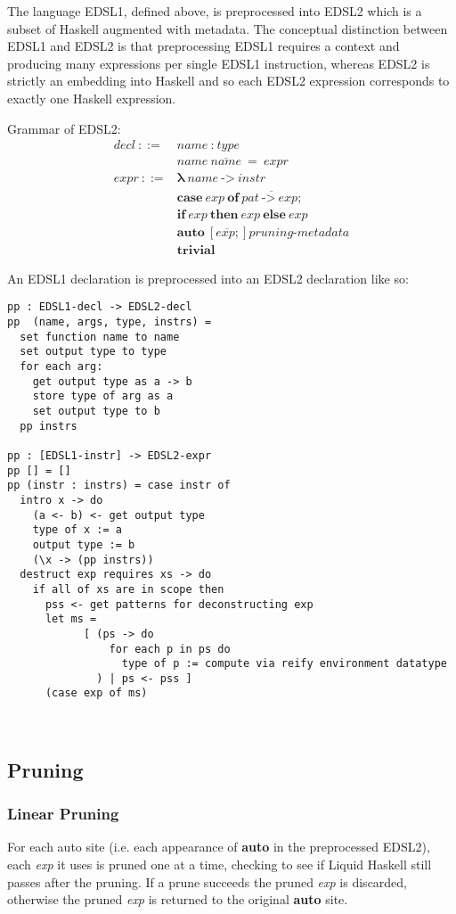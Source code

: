 The language EDSL1, defined above, is preprocessed into EDSL2 which is a subset of Haskell augmented with metadata. 
The conceptual distinction between EDSL1 and EDSL2 is that preprocessing EDSL1 requires a context and producing many expressions per single EDSL1 instruction, whereas EDSL2 is strictly an embedding into Haskell and so each EDSL2 expression corresponds to exactly one Haskell expression.

Grammar of EDSL2:
\begin{align*}
  \textit{decl}~ ::= &
    \textit{name} ~ : ~ \textit{type} \\ &
    \textit{name} ~ \overline{\textit{name}} ~ = ~ \textit{expr}
  \\
  \textit{expr}~ ::= &
    \mathbf{\lambda} ~ \textit{name} ~ \textbf{->} ~ \textit{instr} \\ &
    \textbf{case} ~ \textit{exp} ~ \textbf{of} ~ \overline{\textit{pat} ~ \textbf{->} ~ \textit{exp} ;} \\ & 
    \textbf{if} ~ \textit{exp} ~ \textbf{then} ~ \textit{exp} ~ \textbf{else} ~ \textit{exp} \\ & 
    \textbf{auto} ~ [\overline{\textit{exp} ;}] \textit{pruning-metadata} \\ & 
    \textbf{trivial}
\end{align*}

An EDSL1 declaration is preprocessed into an EDSL2 declaration like so:

\begin{verbatim}
pp : EDSL1-decl -> EDSL2-decl
pp  (name, args, type, instrs) =
  set function name to name
  set output type to type
  for each arg:
    get output type as a -> b 
    store type of arg as a
    set output type to b
  pp instrs

pp : [EDSL1-instr] -> EDSL2-expr
pp [] = []
pp (instr : instrs) = case instr of 
  intro x -> do
    (a <- b) <- get output type
    type of x := a
    output type := b
    (\x -> (pp instrs))
  destruct exp requires xs -> do
    if all of xs are in scope then 
      pss <- get patterns for deconstructing exp 
      let ms = 
            [ (ps -> do 
                for each p in ps do 
                  type of p := compute via reify environment datatype
              ) | ps <- pss ]
      (case exp of ms)

    
\end{verbatim}

\subsection{Pruning}

\subsubsection{Linear Pruning}

For each auto site (i.e. each appearance of \textbf{auto} in the preprocessed EDSL2), each \textit{exp} it uses is pruned one at a time, checking to see if Liquid Haskell still passes after the pruning. If a prune succeeds the pruned \textit{exp} is discarded, otherwise the pruned \textit{exp} is returned to the original \textbf{auto} site.